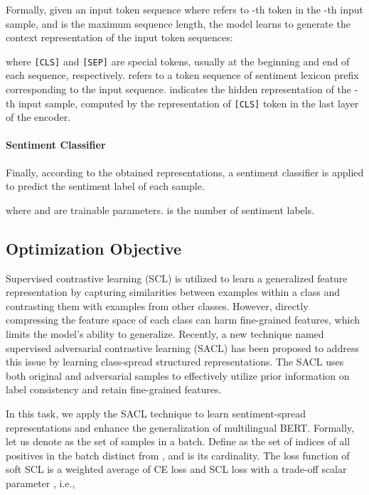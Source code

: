 \documentclass[11pt]{article}
\begin{document}
Formally, given an input token sequence
 where  refers to -th token in the -th input sample, and  is the maximum sequence length, the model learns to generate the context representation of the input token sequences: 

where \texttt{[CLS]} and \texttt{[SEP]} are special tokens, usually at the beginning and end of each sequence, respectively.  refers to a token sequence of sentiment lexicon prefix corresponding to the input sequence.
 indicates the hidden representation of the -th input sample, computed by the representation of \texttt{[CLS]} token in the last layer of the encoder. 


\paragraph{Sentiment Classifier} \label{sec:senti}
Finally, according to the obtained representations, a sentiment classifier is applied to predict the sentiment label of each sample. 
 
where  and  
are trainable parameters.
 is the number of sentiment labels.


\subsection{Optimization Objective}
Supervised contrastive learning (SCL) \citep{DBLP:conf/nips/KhoslaTWSTIMLK20,DBLP:conf/iclr/GunelDCS21} is utilized to learn a generalized feature representation by capturing similarities between examples within a class and contrasting them with examples from other classes. However, directly compressing the feature space of each class can harm fine-grained features, which limits the model's ability to generalize. 
Recently, a new technique named supervised adversarial contrastive learning (SACL) \citep{hu2023supervised} has been proposed to address this issue by learning class-spread structured representations. The SACL uses both original and adversarial samples to effectively utilize prior information on label consistency and retain fine-grained features. 


In this task, we apply the SACL technique to learn sentiment-spread representations and enhance the generalization of multilingual BERT. 
Formally, let us denote  as the set of samples in a batch.
Define  as the set of indices of all positives in the batch distinct from , and  is its cardinality. 
The loss function of soft SCL is a weighted average of CE loss and SCL loss with a trade-off scalar parameter , i.e., 
\end{document}
